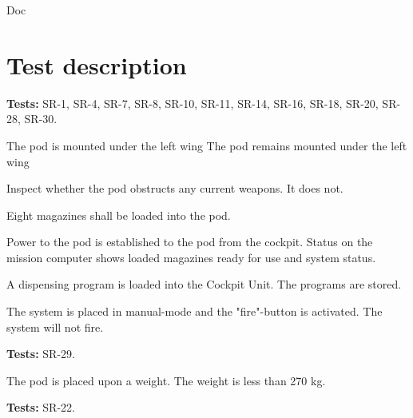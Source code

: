\documentclass[Main]{subfiles}
\begin{document}
Doc

\chapter{Test description}

\textbf{Tests: }
SR-1, SR-4, SR-7, SR-8, SR-10, SR-11, SR-14, SR-16, SR-18, SR-20, SR-28, SR-30.


\begin{TestCaseIntro}
\end{TestCaseIntro}

\begin{TestCase}
\TC
{The pod is mounted under the left wing}
{The pod remains mounted under the left wing}

\TC
{Inspect whether the pod obstructs any current weapons.}
{It does not.}

\TC
{Eight magazines shall be loaded into the pod.}
{}

\TC
{Power to the pod is established to the pod from the cockpit.}
{Status on the mission computer shows loaded magazines ready for use and system status.}

\TC
{A dispensing program is loaded into the Cockpit Unit.}
{The programs are stored.}

\TC
{The system is placed in manual-mode and the "fire"-button is activated.}
{The system will not fire.}

\end{TestCase}

\newpage
\textbf{Tests: } SR-29.


\begin{TestCaseIntro}
\end{TestCaseIntro}

\begin{TestCase}
\TC
{The pod is placed upon a weight.}
{The weight is less than 270 kg.}

\end{TestCase}


\newpage
\textbf{Tests: } SR-22.


\begin{TestCaseIntro}
\end{TestCaseIntro}
\end{document}
